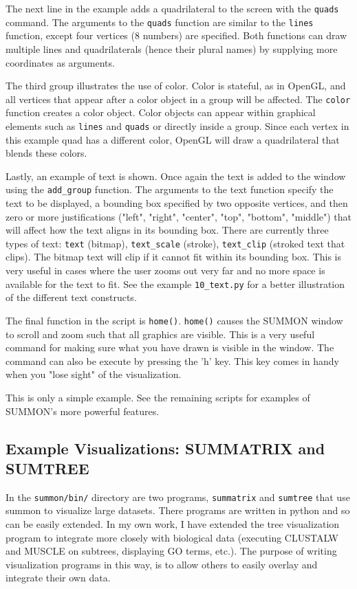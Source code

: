 \documentclass[12pt]{article}
\newcommand{\code}[1]{{\tt #1}}
\begin{document}
The next line in the example adds a quadrilateral to the screen with the
\code{quads} command.  The arguments to the \code{quads} function are similar to
the \code{lines} function, except four vertices (8 numbers) are specified.  Both
functions can draw multiple lines and quadrilaterals (hence their plural names)
by supplying more coordinates as arguments.

The third group illustrates the use of color.  Color is stateful, as in OpenGL,
and all vertices that appear after a color object in a group will be affected. 
The \code{color} function creates a color object.  Color objects can appear
within graphical elements such as \code{lines} and \code{quads} or directly
inside a group.  Since each vertex in this example quad has a different color,
OpenGL will draw a quadrilateral that blends these colors.

Lastly, an example of text is shown.  Once again the text is added to the window
using the \code{add\_group} function.  The arguments to the text function
specify the text to be displayed, a bounding box specified by two
opposite  vertices, and then zero or more justifications ("left", "right",
"center", "top", "bottom", "middle") that will affect how the text aligns in its
bounding box.  There are currently three types of text: \code{text} (bitmap),
\code{text\_scale} (stroke), \code{text\_clip} (stroked text that clips).  The
bitmap text will clip if it cannot fit within its bounding box.  This is very
useful in cases where the user zooms out very far and no more space is available
for the text to fit.  See the example \code{10\_text.py} for a better
illustration of the different text constructs.

The final function in the script is \code{home()}.  \code{home()} causes the
SUMMON window to scroll and zoom such that all graphics are visible.  This is a
very useful command for making sure what you have drawn is visible in the
window.  The command can also be execute by pressing the 'h' key.  This key 
comes in handy when you "lose sight" of the visualization.

This is only a simple example.  See the remaining scripts for examples of
SUMMON's more powerful features.

\subsection{Example Visualizations: SUMMATRIX and SUMTREE}

In the \code{summon/bin/} directory are two programs, \code{summatrix} and
\code{sumtree} that use summon to visualize large datasets.  There programs are
written in python and so can be easily extended.  In my own work, I have 
extended the tree visualization program to integrate more closely with
biological data (executing CLUSTALW and MUSCLE on subtrees, displaying GO terms,
etc.).  The purpose of writing visualization programs in this way, is to allow
others to easily overlay and integrate their own data.  
\end{document}
